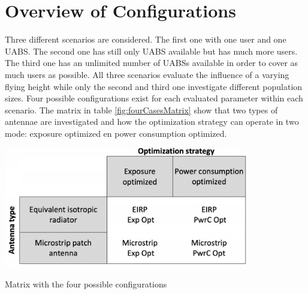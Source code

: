 \section{Overview of Configurations}
Three different scenarios are considered. The first one with one user and one \gls{UABS}. The second one has 
still only \gls{UABS} available but has much more users. The third one has an unlimited number of \gls{UABS}s 
available in order to cover as much users as possible.
All three scenarios evaluate the influence of a varying flying height while only the second and third one 
investigate different population sizes.
Four possible configurations exist for each evaluated parameter within each scenario.
The matrix in table \ref{fig:fourCasesMatrix} show that two types of antennae are investigated and how the optimization
strategy can operate in two mode: exposure optimized en power consumption optimized.

\begin{table}[h!]
\centering
  \includegraphics[width=0.8\textwidth]{../images/fourCasesMatrix.png}
  \caption{Matrix with the four possible configurations}
  \label{fig:fourCasesMatrix}
\end{table}
